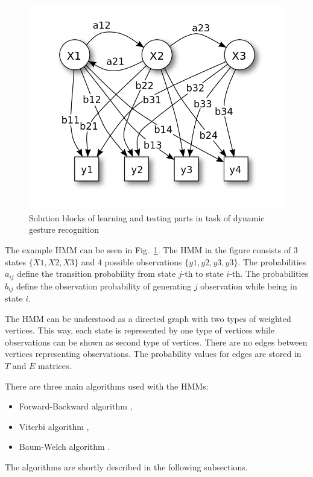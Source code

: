 \begin{figure}[htbp!]
\centering
 \includegraphics[width=0.8\columnwidth]{figures/HMM_wiki.png}
 \caption[]{Solution blocks of learning and testing parts in task of dynamic gesture recognition\footnotemark}
 \label{dynamicgestureswiki}
\end{figure}


The example HMM can be seen in Fig.~\ref{dynamicgestureswiki}.
The HMM in the figure consists of 3 states $\{X1, X2, X3\}$ and 4 possible observations $\{y1, y2, y3, y3\}$.
The probabilities $a_{ij}$ define the transition probability from state $j$-th to state $i$-th. 
The probabilities $b_{ij}$ define the observation probability of generating $j$ observation while being in state $i$.

The HMM can be understood as a directed graph with two types of weighted vertices. 
This way, each state is represented by one type of vertices while observations can be shown as second type of vertices.
There are no edges between vertices representing observations.
The probability values for edges are stored in $T$ and $E$ matrices.

There are three main algorithms used with the HMMs:
\begin{itemize}
\item Forward-Backward algorithm \cite{hmmtutorial, hmm}, 
\item Viterbi algorithm \cite{hmmtutorial, hmm},
\item Baum-Welch algorithm \cite{hmmtutorial, hmm}.
\end{itemize}

The algorithms are shortly described in the following subsections.

